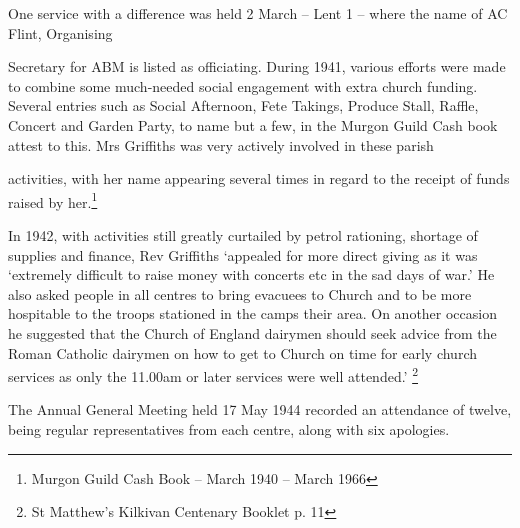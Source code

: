 One service with a difference was held 2 March -- Lent 1 -- where the
name of AC Flint, Organising

Secretary for ABM is listed as officiating. During 1941, various efforts
were made to combine some much-needed social engagement with extra
church funding. Several entries such as Social Afternoon, Fete Takings,
Produce Stall, Raffle, Concert and Garden Party, to name but a few, in
the Murgon Guild Cash book attest to this. Mrs Griffiths was very
actively involved in these parish

activities, with her name appearing several times in regard to the
receipt of funds raised by her.\footnote{Murgon Guild Cash Book -- March
  1940 -- March 1966}

In 1942, with activities still greatly curtailed by petrol rationing,
shortage of supplies and finance, Rev Griffiths `appealed for more
direct giving as it was `extremely difficult to raise money with
concerts etc in the sad days of war.' He also asked people in all
centres to bring evacuees to Church and to be more hospitable to the
troops stationed in the camps their area. On another occasion he
suggested that the Church of England dairymen should seek advice from
the Roman Catholic dairymen on how to get to Church on time for early
church services as only the 11.00am or later services were well
attended.' \footnote{St Matthew's Kilkivan Centenary Booklet p. 11}

The Annual General Meeting held 17 May 1944 recorded an attendance of
twelve, being regular representatives from each centre, along with six
apologies.

